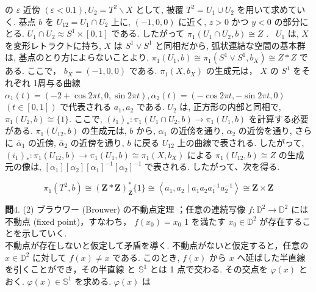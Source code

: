 \documentclass[10pt]{jsarticle}
\begin{document}
の $\varepsilon$ 近傍 $(\varepsilon<0.1), U_{2}=T^{2} \backslash X$ として, 被覆 $T^{2}=U_{1} \cup U_{2}$ を用いて求めていく.
基点 $b$ を $U_{12}=U_{1} \cap U_{2}$ 上に, $(-1,0,0)$ に近く, $z>0$ かつ $y<0$ の部分にとる. 
$U_{1} \cap U_{2} \approx S^{1} \times[0,1]$ である. したがって $\pi_{1}\left(U_{1} \cap U_{2}, b\right) \cong Z$ . \ $U_{1}$ は, $X$ を変形レトラクトに持ち, $X$ は $S^{1} \vee S^{1}$ と同相だから, 弧状連結な空間の基本群は, 基点のとり方によらないことより, $\pi_{1}\left(U_{1}, b\right) \cong \pi_{1}\left(S^{1} \vee S^{1}, b_{X}\right) \cong Z * Z$ である. 
ここで， $b_{X}=(-1,0,0)$ である. $\pi_{1}\left(X, b_{X}\right)$ の生成元は， $X$ の $S^{1}$ をそれぞれ 1周与る曲線 $\alpha_{1}(t)=(-2+\cos 2 \pi t, 0, \sin 2 \pi t), \alpha_{2}(t)=(-\cos 2 \pi t,-\sin 2 \pi t, 0)$ $(t \in[0,1])$ で代表される $a_{1}, a_{2}$ である. $U_{2}$ は, 正方形の内部と同相で, $\pi_{1}\left(U_{2}, b\right) \cong\{1\}$. ここで, $\left(i_{1}\right)_{*}: \pi_{1}\left(U_{1} \cap U_{2}, b\right) \longrightarrow \pi_{1}\left(U_{1}, b\right)$ を計算する必要
がある. $\pi_{1}\left(U_{12}, b\right)$ の生成元は, $b$ から, $\alpha_{1}$ の近傍を通り, $\alpha_{2}$ の近傍を通り, さらに $\bar{\alpha}_{1}$ の近傍, $\bar{\alpha}_{2}$ の近傍を通り, $b$ に戻る $U_{12}$ 上の曲線で表される. したがって, $\left(i_{1}\right)_{*}: \pi_{1}\left(U_{12}, b\right) \longrightarrow \pi_{1}\left(U_{1}, b\right) \cong \pi_{1}\left(X, b_{X}\right)$ による $\pi_{1}\left(U_{12}, b\right) \cong Z$ の生成元の像は, $\left[\alpha_{1}\right]\left[\alpha_{2}\right]\left[\alpha_{1}\right]^{-1}\left[\alpha_{2}\right]^{-1}$ で表される. したがって、次を得る.

$$
\pi_{1}\left(T^{2}, b\right) \cong(\boldsymbol{Z} * \boldsymbol{Z})_{\boldsymbol{Z}}^{*}\{1\} \cong\left\langle a_{1}, a_{2} \mid a_{1} a_{2} a_{1}^{-1} a_{2}^{-1}\right\rangle \cong \boldsymbol{Z} \times \boldsymbol{Z}
$$

\bigskip
\bigskip

{\bf 問$4$}. (2) ブラウワー (Brouwer) の不動点定理
；任意の連続写像 $f: \mathbb{D}^{2} \longrightarrow \mathbb{D}^{2}$ には不動点 (fixed point)，すなわち， $f\left(x_{0}\right)=x_{0}$ 1 を満たす $x_{0} \in \mathbb{D}^{2}$ が存在することを示していく.\\
不動点が存在しないと仮定して矛盾を導く. 不動点がないと仮定すると，任意の $x \in \mathbb{D}^{2}$ に対して $f(x) \neq x$ である. このとき, $f(x)$ から $x$ へ延ばした半直線を引くことができ，その半直線 と $\mathbb{S}^{1}$ とは 1 点で交わる. その交点を $\varphi(x)$ とおく. $\varphi(x) \in \mathbb{S}^{1}$ を求める. $\varphi(x)$ は
\end{document}
